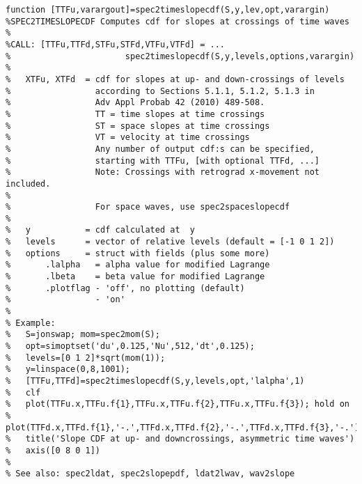 {\begin{verbatim}
function [TTFu,varargout]=spec2timeslopecdf(S,y,lev,opt,varargin)
%SPEC2TIMESLOPECDF Computes cdf for slopes at crossings of time waves 
%
%CALL: [TTFu,TTFd,STFu,STFd,VTFu,VTFd] = ... 
%                       spec2timeslopecdf(S,y,levels,options,varargin)
%
%   XTFu, XTFd  = cdf for slopes at up- and down-crossings of levels 
%                 according to Sections 5.1.1, 5.1.2, 5.1.3 in 
%                 Adv Appl Probab 42 (2010) 489-508. 
%                 TT = time slopes at time crossings
%                 ST = space slopes at time crossings
%                 VT = velocity at time crossings
%                 Any number of output cdf:s can be specified, 
%                 starting with TTFu, [with optional TTFd, ...]   
%                 Note: Crossings with retrograd x-movement not included. 
%
%                 For space waves, use spec2spaceslopecdf 
%
%   y           = cdf calculated at  y
%   levels      = vector of relative levels (default = [-1 0 1 2])
%   options     = struct with fields (plus some more)
%       .lalpha   = alpha value for modified Lagrange
%       .lbeta    = beta value for modified Lagrange
%       .plotflag - 'off', no plotting (default)
%                 - 'on' 
%
% Example:
%   S=jonswap; mom=spec2mom(S);
%   opt=simoptset('du',0.125,'Nu',512,'dt',0.125);
%   levels=[0 1 2]*sqrt(mom(1));
%   y=linspace(0,8,1001);
%   [TTFu,TTFd]=spec2timeslopecdf(S,y,levels,opt,'lalpha',1)
%   clf
%   plot(TTFu.x,TTFu.f{1},TTFu.x,TTFu.f{2},TTFu.x,TTFu.f{3}); hold on
%   plot(TTFd.x,TTFd.f{1},'-.',TTFd.x,TTFd.f{2},'-.',TTFd.x,TTFd.f{3},'-.')
%   title('Slope CDF at up- and downcrossings, asymmetric time waves')
%   axis([0 8 0 1])
%
% See also: spec2ldat, spec2slopepdf, ldat2lwav, wav2slope
\end{verbatim}
\clearpage

}
